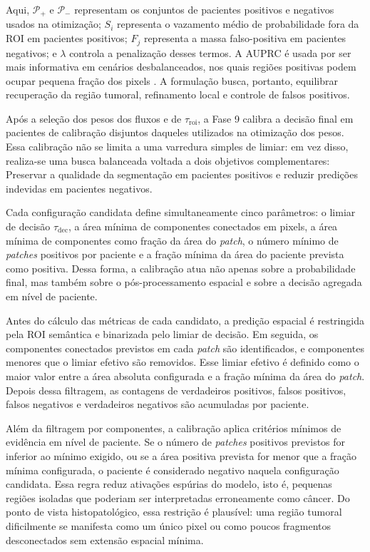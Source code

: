 Aqui, $\mathcal{P}_+$ e $\mathcal{P}_-$ representam os conjuntos de pacientes
positivos e negativos usados na otimização; $S_i$ representa o vazamento médio de
probabilidade fora da ROI em pacientes positivos; $F_j$ representa a massa
falso-positiva em pacientes negativos; e $\lambda$ controla a penalização desses
termos. A AUPRC é usada por ser mais informativa em cenários desbalanceados, nos
quais regiões positivas podem ocupar pequena fração dos pixels
\cite{saito2015precision}. A formulação busca, portanto, equilibrar recuperação
da região tumoral, refinamento local e controle de falsos positivos.

Após a seleção dos pesos dos fluxos e de $\tau_{\mathrm{roi}}$, a Fase 9 calibra
a decisão final em pacientes de calibração disjuntos daqueles utilizados na
otimização dos pesos. Essa calibração não se limita a uma varredura simples de
limiar: em vez disso, realiza-se uma busca balanceada voltada a dois objetivos
complementares: Preservar a qualidade da segmentação em pacientes positivos e
reduzir predições indevidas em pacientes negativos.

Cada configuração candidata define simultaneamente cinco parâmetros: o limiar de
decisão $\tau_{\mathrm{dec}}$, a área mínima de componentes conectados em pixels,
a área mínima de componentes como fração da área do \textit{patch}, o número
mínimo de \textit{patches} positivos por paciente e a fração mínima da área do
paciente prevista como positiva. Dessa forma, a calibração atua não apenas sobre
a probabilidade final, mas também sobre o pós-processamento espacial e sobre a
decisão agregada em nível de paciente.

Antes do cálculo das métricas de cada candidato, a predição espacial é
restringida pela ROI semântica e binarizada pelo limiar de decisão. Em seguida,
os componentes conectados previstos em cada \textit{patch} são identificados, e
componentes menores que o limiar efetivo são removidos. Esse limiar efetivo é
definido como o maior valor entre a área absoluta configurada e a fração mínima
da área do \textit{patch}. Depois dessa filtragem, as contagens de verdadeiros
positivos, falsos positivos, falsos negativos e verdadeiros negativos são
acumuladas por paciente.

Além da filtragem por componentes, a calibração aplica critérios mínimos de
evidência em nível de paciente. Se o número de \textit{patches} positivos
previstos for inferior ao mínimo exigido, ou se a área positiva prevista for
menor que a fração mínima configurada, o paciente é considerado negativo naquela
configuração candidata. Essa regra reduz ativações espúrias do modelo, isto é,
pequenas regiões isoladas que poderiam ser interpretadas erroneamente como
câncer. Do ponto de vista histopatológico, essa restrição é plausível: uma região
tumoral dificilmente se manifesta como um único pixel ou como poucos fragmentos
desconectados sem extensão espacial mínima.

